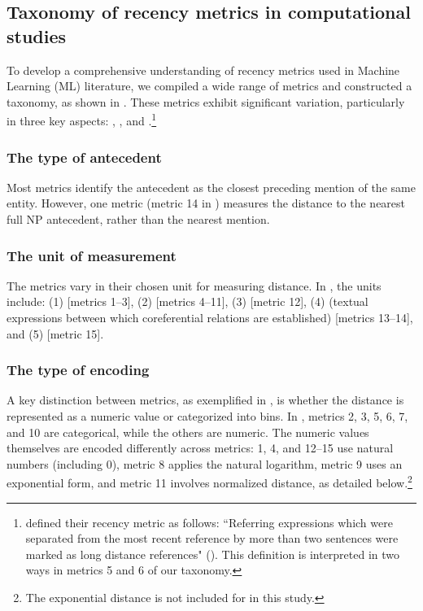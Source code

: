 \subsection{Taxonomy of recency metrics in computational studies}\label{subsec:recencytaxonomy}

To develop a comprehensive understanding of recency metrics used in Machine Learning (ML) literature, we compiled a wide range of metrics and constructed a taxonomy, as shown in . These metrics exhibit significant variation, particularly in three key aspects: , , and .\footnote{\citeauthor{greenbacker2009udel} defined their recency metric as follows: ``Referring expressions which were separated from the most recent reference by more than two sentences were marked as long distance references" (\citeyear[101]{greenbacker2009udel}). This definition is interpreted in two ways in metrics 5 and 6 of our taxonomy.}



\subsubsection{The type of antecedent}
Most metrics identify the antecedent as the closest preceding mention of the same entity. However, one metric (metric 14 in ) measures the distance to the nearest full NP antecedent, rather than the nearest mention.

\subsubsection{The unit of measurement}\label{par:measunit} 
The metrics vary in their chosen unit for measuring distance. In , the units include: (1)  [metrics 1--3], (2)  [metrics 4--11], (3)  [metric 12], (4)  (textual expressions between which coreferential relations are established) \citep{chiarcos2005annotation} [metrics 13--14], and (5)  [metric 15].

\subsubsection{The type of encoding} 
A key distinction between metrics, as exemplified in , is whether the distance is represented as a numeric value or categorized into bins. In , metrics 2, 3, 5, 6, 7, and 10 are categorical, while the others are numeric. The numeric values themselves are encoded differently across metrics: 1, 4, and 12--15 use natural numbers (including 0), metric 8 applies the natural logarithm, metric 9 uses an exponential form, and metric 11 involves normalized distance, as detailed below.\footnote{The exponential distance is not included for \wsj in this study.}

